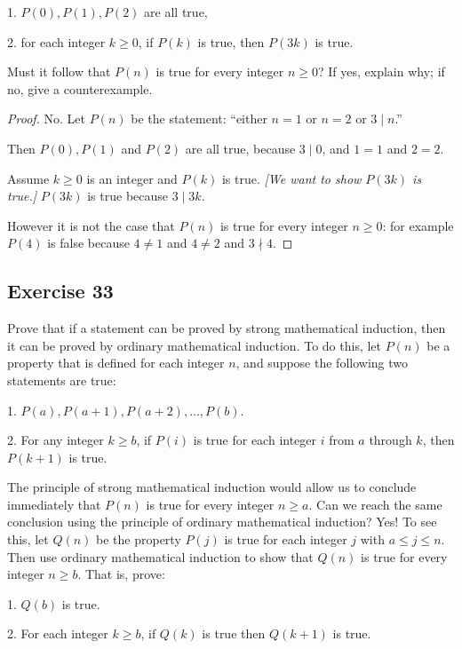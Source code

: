 \documentclass[14pt]{extarticle}
\begin{document}
1. $P(0), P(1), P(2)$ are all true,

2. for each integer $k \geq 0$, if $P(k)$ is true, then
$P(3k)$ is true.

Must it follow that $P(n)$ is true for every integer $n \geq 0$? If yes, explain why; if no, give a counterexample.

\begin{proof}
    No. Let $P(n)$ be the statement: ``either $n = 1$ or $n = 2$ or $3 \mid n$.''

    Then $P(0), P(1)$ and $P(2)$ are all true, because $3 \mid 0$, and $1 = 1$ and $2 = 2$.

    Assume $k \geq 0$ is an integer and $P(k)$ is true. {\it [We want to show $P(3k)$ is true.]}
    $P(3k)$ is true because $3 \mid 3k$.

    However it is not the case that $P(n)$ is true for every integer $n \geq 0$: for example $P(4)$ is false because $4 \neq 1$ and $4 \neq 2$ and $3 \nmid 4$.
\end{proof}

\subsection{Exercise 33}
Prove that if a statement can be proved by strong mathematical induction, then it can be proved by ordinary mathematical induction. To do this, let $P(n)$ be a property that is defined for each integer $n$, and suppose the following two statements are true:

1. $P(a), P(a + 1), P(a + 2), \ldots, P(b)$.

2. For any integer $k \geq b$, if $P(i)$ is true for each
integer $i$ from $a$ through $k$, then $P(k + 1)$ is true.

The principle of strong mathematical induction would allow us to conclude immediately that $P(n)$ is true for every integer $n \geq a$. Can we reach the same conclusion using the principle of ordinary mathematical induction? Yes! To see this, let $Q(n)$ be the property $P(j)$ is true for each integer $j$ with $a \leq j \leq n$. Then use ordinary mathematical induction to show that $Q(n)$ is true for every integer $n \geq b$. That is, prove:

1. $Q(b)$ is true.

2. For each integer $k \geq b$, if $Q(k)$ is true then $Q(k + 1)$ is true.
\end{document}
